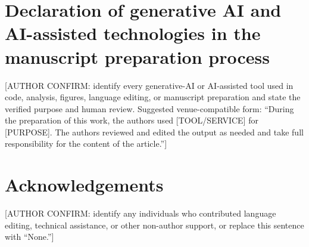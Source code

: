 \section*{Declaration of generative AI and AI-assisted technologies in the manuscript preparation process}
[AUTHOR CONFIRM: identify every generative-AI or AI-assisted tool used in code, analysis, figures, language editing, or manuscript preparation and state the verified purpose and human review. Suggested venue-compatible form: ``During the preparation of this work, the authors used [TOOL/SERVICE] for [PURPOSE]. The authors reviewed and edited the output as needed and take full responsibility for the content of the article.'']

\section*{Acknowledgements}
[AUTHOR CONFIRM: identify any individuals who contributed language editing, technical assistance, or other non-author support, or replace this sentence with ``None.'']
